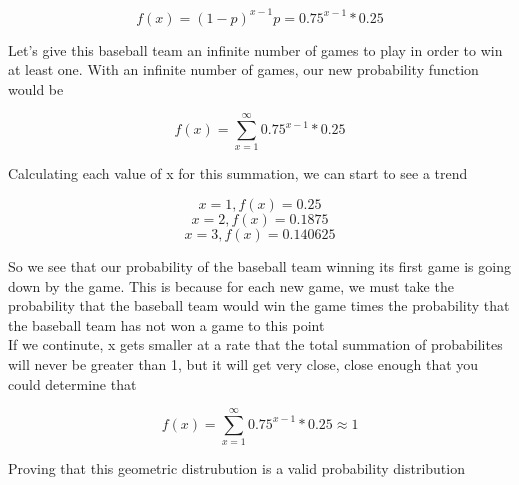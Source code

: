 \documentclass[14pt]{article}
\begin{document}
\[ f(x) = (1 - p)^{x-1}p = 0.75^{x-1} * 0.25 \]

\noindent Let's give this baseball team an infinite number of games to play in order to win at least one. With an infinite number of games, our new probability function would be

\[ f(x) = \sum^{\infty}_{x=1} 0.75^{x-1} * 0.25 \]

\noindent Calculating each value of x for this summation, we can start to see a trend 

\[ x = 1, f(x) = 0.25 \]
\[ x = 2, f(x) = 0.1875 \]
\[ x = 3, f(x) = 0.140625 \]

\noindent So we see that our probability of the baseball team winning its first game is going down by the game. This is because for each new game, we must take the probability that the baseball team would win the game times the probability that the baseball team has not won a game to this point \\

\noindent If we continute, x gets smaller at a rate that the total summation of probabilites will never be greater than 1, but it will get very close, close enough that you could determine that 

\[ f(x) = \sum^{\infty}_{x=1} 0.75^{x-1} * 0.25 \approx 1 \]


\noindent Proving that this geometric distrubution is a valid probability distribution
\end{document}
